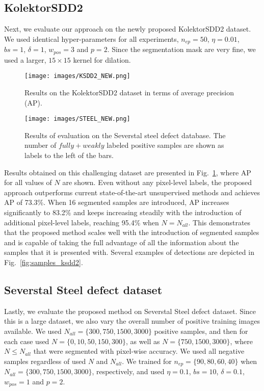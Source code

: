 \subsection{KolektorSDD2}
Next, we evaluate our approach on the newly proposed KolektorSDD2 dataset. We used identical hyper-parameters for all experiments, $n_{ep}=50$, $\eta=0.01$, $bs=1$, $\delta=1$, $w_{pos}=3$ and $p=2$. Since the segmentation mask are very fine, we used a larger, $15\times15$ kernel for dilation. 

\begin{figure}%
    \begin{center}
        \texttt{[image: images/KSDD2\_NEW.png]}
    \end{center}
    \caption{Results on the KolektorSDD2 dataset in terms of average precision (AP).
    } 
    \label{fig:ksdd2}
\end{figure}

\begin{figure}[h]
    \begin{center}
        \texttt{[image: images/STEEL\_NEW.png]}
    \end{center}
    \caption{Results of evaluation on the Severstal steel defect database. The number of $fully +  weakly$ labeled positive samples are shown as labels to the left of the bars.} 
    \label{fig:steel}
\end{figure}

Results obtained on this challenging dataset are presented in Fig.~\ref{fig:ksdd2}, where AP for all values of $N$ are shown.
Even without any pixel-level labels, the proposed approach outperforms current state-of-the-art unsupervised methods and achieves AP of 73.3\%. When 16 segmented samples are introduced, AP increases significantly to 83.2\% and keeps increasing steadily with the introduction of additional pixel-level labels, reaching 95.4\% when $N=N_{all}$. 
This demonstrates that the proposed method scales well with the introduction of segmented samples and is capable of taking the full advantage of all the information about the samples that it is presented with. Several examples of detections are depicted in Fig.~\ref{fig:samples_ksdd2}.

\subsection{Severstal Steel defect dataset}
Lastly, we evaluate the proposed method on Severstal Steel defect dataset. Since this is a large dataset, we also vary the overall number of positive training images available. We used $N_{all} = \{300, 750, 1500, 3000\}$ positive samples, and then for each case used $N = \{0, 10, 50, 150, 300\}$, as well as $N=\{750, 1500, 3000\}$, where $N\leq N_{all}$ that were segmented with pixel-wise accuracy. We used all negative samples regardless of used $N$ and $N_{all}$. We trained for $n_{ep}=\{90, 80, 60, 40\}$ when $N_{all}=\{300, 750, 1500, 3000\}$, respectively, and used $\eta=0.1$, $bs=10$,  $\delta=0.1$, $w_{pos}=1$ and $p=2$. 


